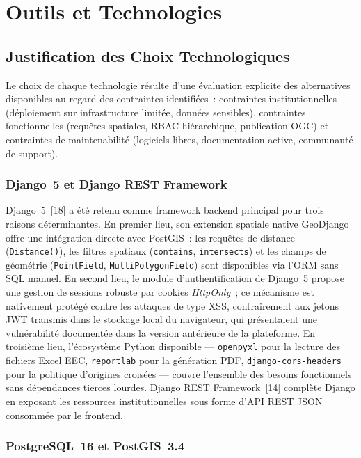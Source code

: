 \documentclass[12pt, a4paper]{report}
\begin{document}
\section{Outils et Technologies}
\label{sec:outils}

\subsection{Justification des Choix Technologiques}
\label{ssec:justification}

Le choix de chaque technologie résulte d'une évaluation explicite des
alternatives disponibles au regard des contraintes identifiées~: contraintes
institutionnelles (déploiement sur infrastructure limitée, données
sensibles), contraintes fonctionnelles (requêtes spatiales, RBAC
hiérarchique, publication OGC) et contraintes de maintenabilité
(logiciels libres, documentation active, communauté de support).

\subsubsection{Django~5 et Django REST Framework}

Django~5~[18] a été retenu comme framework backend principal
pour trois raisons déterminantes. En premier lieu, son extension spatiale
native GeoDjango offre une intégration directe avec PostGIS~: les requêtes
de distance (\texttt{Distance()}), les filtres spatiaux (\texttt{contains},
\texttt{intersects}) et les champs de géométrie (\texttt{PointField},
\texttt{MultiPolygonField}) sont disponibles via l'ORM sans SQL manuel.
En second lieu, le module d'authentification de Django~5 propose une gestion
de sessions robuste par cookies \textit{HttpOnly}~; ce mécanisme est
nativement protégé contre les attaques de type XSS, contrairement aux
jetons JWT transmis dans le stockage local du navigateur, qui présentaient
une vulnérabilité documentée dans la version antérieure de la plateforme.
En troisième lieu, l'écosystème Python disponible ---
\texttt{openpyxl} pour la lecture des fichiers Excel EEC,
\texttt{reportlab} pour la génération PDF, \texttt{django-cors-headers}
pour la politique d'origines croisées --- couvre l'ensemble des besoins
fonctionnels sans dépendances tierces lourdes. Django REST
Framework~[14] complète Django en exposant les ressources
institutionnelles sous forme d'API REST JSON consommée par le frontend.

\subsubsection{PostgreSQL~16 et PostGIS~3.4}
\end{document}

